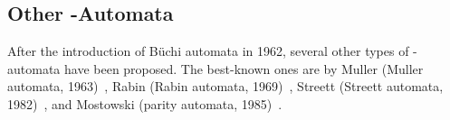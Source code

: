 






\subsection{Other \om-Automata}
After the introduction of Büchi automata in 1962, several other types of \om-automata have been proposed. The best-known ones are by Muller (Muller automata, 1963)~\cite{1963_muller}, Rabin (Rabin automata, 1969)~\cite{rabin1969decidability}, Streett (Streett automata, 1982)~\cite{Streett1982121}, and Mostowski (parity automata, 1985)~\cite{1985_mostowski}.

